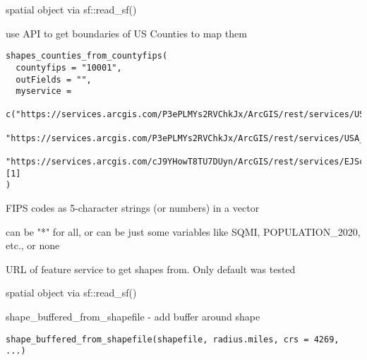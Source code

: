 \documentclass[a4paper]{book}
\begin{document}
%
\begin{Value}
spatial object via sf::read\_sf()
\end{Value}
%
\begin{Description}\relax
use API to get boundaries of US Counties to map them
\end{Description}
%
\begin{Usage}
\begin{verbatim}
shapes_counties_from_countyfips(
  countyfips = "10001",
  outFields = "",
  myservice =
    c("https://services.arcgis.com/P3ePLMYs2RVChkJx/ArcGIS/rest/services/USA_Boundaries_2022/FeatureServer/2/query",
    "https://services.arcgis.com/P3ePLMYs2RVChkJx/ArcGIS/rest/services/USA_Counties_and_States_with_PR/FeatureServer/0/query",
    "https://services.arcgis.com/cJ9YHowT8TU7DUyn/ArcGIS/rest/services/EJScreen_2_22_US_Percentiles_Tracts/FeatureServer/query")[1]
)
\end{verbatim}
\end{Usage}
%
\begin{Arguments}
\begin{ldescription}
\item[\code{countyfips}] FIPS codes as 5-character strings (or numbers) in a vector

\item[\code{outFields}] can be "*" for all, or can be
just some variables like SQMI, POPULATION\_2020, etc., or none

\item[\code{myservice}] URL of feature service to get shapes from.
Only default was tested
\end{ldescription}
\end{Arguments}
%
\begin{Value}
spatial object via sf::read\_sf()
\end{Value}
%
\begin{Description}\relax
shape\_buffered\_from\_shapefile - add buffer around shape
\end{Description}
%
\begin{Usage}
\begin{verbatim}
shape_buffered_from_shapefile(shapefile, radius.miles, crs = 4269, ...)
\end{verbatim}
\end{Usage}
\end{document}
